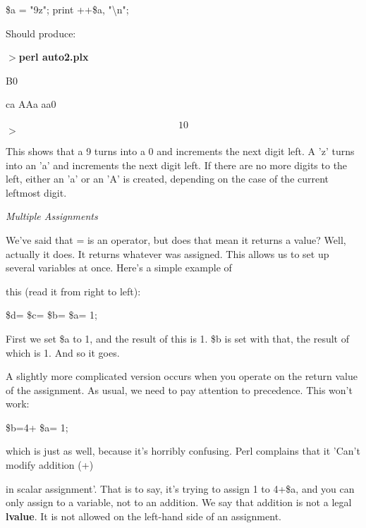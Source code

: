 \documentclass[a4paper,11pt]{book}
\begin{document}
\noindent \$a = "9z"; print ++\$a, "\textbackslash n";

\noindent 

\noindent Should produce:

\noindent 

\noindent $>$\textbf{perl auto2.plx}

\noindent B0

\noindent ca AAa aa0

\[10\] 
$>$

\noindent 

\noindent This shows that a 9 turns into a 0 and increments the next digit left. A 'z' turns into an 'a' and increments the next digit left. If there are no more digits to the left, either an 'a' or an 'A' is created, depending on the case of the current leftmost digit.

\noindent 

\noindent \textit{Multiple Assignments}

\noindent We've said that = is an operator, but does that mean it returns a value? Well, actually it does. It returns whatever was assigned. This allows us to set up several variables at once. Here's a simple example of

\noindent this (read it from right to left):

\noindent 

\noindent \$d= \$c= \$b= \$a= 1;

\noindent 

\noindent First we set \$a to 1, and the result of this is 1. \$b is set with that, the result of which is 1. And so it goes.

\noindent 

\noindent A slightly more complicated version occurs when you operate on the return value of the assignment. As usual, we need to pay attention to precedence. This won't work:

\noindent 

\noindent \$b=4+ \$a= 1;

\noindent 

\noindent which is just as well, because it's horribly confusing. Perl complains that it 'Can't modify addition (+)

\noindent in scalar assignment'.  That is  to  say,  it's  trying  to  assign  1 to  4+\$a,  and you  can  only  assign  to  a variable, not to an addition. We say that addition is not a legal \textbf{lvalue}. It is not allowed on the left-hand side of an assignment.
\end{document}
